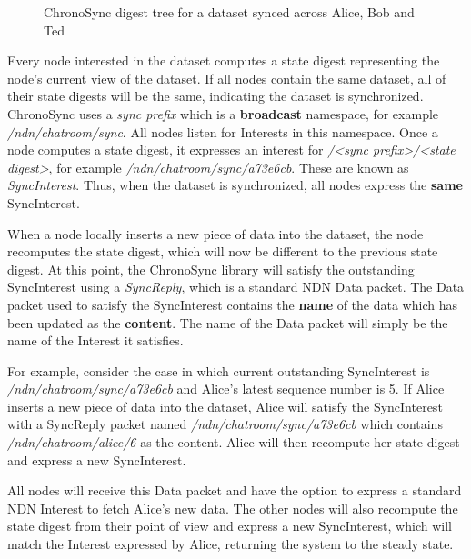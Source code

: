 \begin{figure}[H]
    \centering
    \caption{ChronoSync digest tree for a dataset synced across Alice, Bob and Ted \cite{chronosync}}
    \label{fig:chronosync-digest-tree}
\end{figure}

Every node interested in the dataset computes a state digest representing the node's current view of the dataset. If all nodes contain the same dataset, all of their state digests will be the same, indicating the dataset is synchronized. ChronoSync uses a \textit{sync prefix} which is a \textbf{broadcast} namespace, for example \textit{/ndn/chatroom/sync}. All nodes listen for Interests in this namespace. Once a node computes a state digest, it expresses an interest for \textit{/<sync prefix>/<state digest>}, for example \textit{/ndn/chatroom/sync/a73e6cb}. These are known as \textit{SyncInterest}. Thus, when the dataset is synchronized, all nodes express the \textbf{same} SyncInterest.

When a node locally inserts a new piece of data into the dataset, the node recomputes the state digest, which will now be different to the previous state digest. At this point, the ChronoSync library will satisfy the outstanding SyncInterest using a \textit{SyncReply}, which is a standard NDN Data packet. The Data packet used to satisfy the SyncInterest contains the \textbf{name} of the data which has been updated as the \textbf{content}. The name of the Data packet will simply be the name of the Interest it satisfies. 

For example, consider the case in which current outstanding SyncInterest is \textit{/ndn/chatroom/sync/a73e6cb} and Alice's latest sequence number is 5. If Alice inserts a new piece of data into the dataset, Alice will satisfy the SyncInterest with a SyncReply packet named \textit{/ndn/chatroom/sync/a73e6cb} which contains \textit{/ndn/chatroom/alice/6} as the content. Alice will then recompute her state digest and express a new SyncInterest.

All nodes will receive this Data packet and have the option to express a standard NDN Interest to fetch Alice's new data. The other nodes will also recompute the state digest from their point of view and express a new SyncInterest, which will match the Interest expressed by Alice, returning the system to the steady state.

